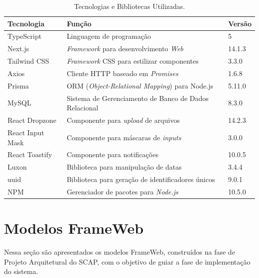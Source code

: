 \begin{table}[h]
    \centering
    \caption{Tecnologias e Bibliotecas Utilizadas.}
    \label{tab-tecnologias}
    \begin{tabularx}{\textwidth}{|p{4cm}|X|p{2cm}|}%
        \hline
        \textbf{Tecnologia} & \textbf{Função} & \textbf{Versão} \\
        \hline
        TypeScript & Linguagem de programação & 5 \\
        \hline
        Next.js & \textit{Framework} para desenvolvimento \textit{Web} & 14.1.3 \\
        \hline
        Tailwind CSS & \textit{Framework} CSS para estilizar componentes & 3.3.0 \\
        \hline
        Axios & Cliente HTTP baseado em \textit{Promises} & 1.6.8 \\
        \hline
        Prisma & ORM (\textit{Object-Relational Mapping}) para Node.js & 5.11.0 \\
        \hline
        MySQL & Sistema de Gerenciamento de Banco de Dados Relacional & 8.3.0 \\
        \hline
        React Dropzone & Componente para \textit{upload} de arquivos & 14.2.3 \\
        \hline
        React Input Mask & Componente para máscaras de \textit{inputs} & 3.0.0 \\
        \hline
        React Toastify & Componente para notificações & 10.0.5 \\
        \hline
        Luxon & Biblioteca para manipulação de datas & 3.4.4 \\
        \hline
        uuid & Biblioteca para geração de identificadores únicos & 9.0.1 \\
        \hline
        NPM & Gerenciador de pacotes para \textit{Node.js} & 10.5.0 \\
        \hline
        \end{tabularx}
\end{table}




\section{Modelos FrameWeb}
\label{sec-projeto-frameweb}

Nessa seção são apresentados os modelos FrameWeb, construídos na fase de Projeto Arquitetural
do SCAP, com o objetivo de guiar a fase de implementação do sistema.

